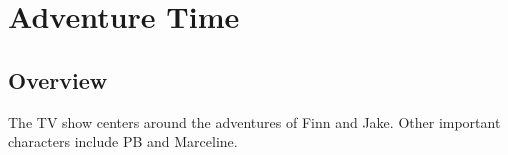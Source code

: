 \documentclass[a4paper, 12pt]{report}
\begin{document}
\chapter{Adventure Time}

\section{Overview}

The TV show centers around the adventures of Finn and Jake. Other important characters include \gls{PB} and \gls{Marceline}.

\printglossaries
\end{document}

